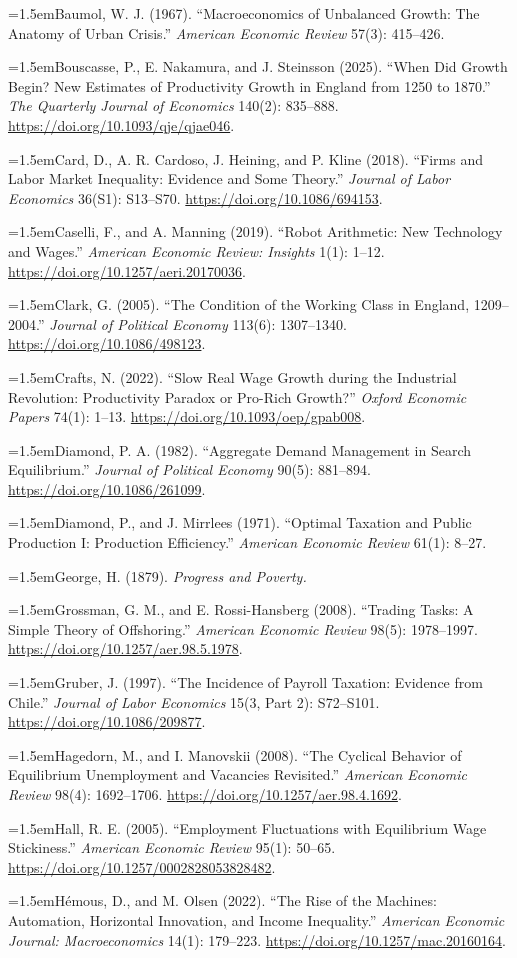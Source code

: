 \documentclass[12pt]{article}
\theoremstyle{plain}
\newcommand{\refentry}[1]{\par\hangindent=1.5em\hangafter=1\noindent #1}
\begin{document}
{\refentry{Baumol, W. J. (1967). ``Macroeconomics of Unbalanced Growth: The Anatomy of Urban Crisis.'' \emph{American Economic Review} 57(3): 415--426.}
\refentry{Bouscasse, P., E. Nakamura, and J. Steinsson (2025). ``When Did Growth Begin? New Estimates of Productivity Growth in England from 1250 to 1870.'' \emph{The Quarterly Journal of Economics} 140(2): 835--888. \url{https://doi.org/10.1093/qje/qjae046}.}
\refentry{Card, D., A. R. Cardoso, J. Heining, and P. Kline (2018). ``Firms and Labor Market Inequality: Evidence and Some Theory.'' \emph{Journal of Labor Economics} 36(S1): S13--S70. \url{https://doi.org/10.1086/694153}.}
\refentry{Caselli, F., and A. Manning (2019). ``Robot Arithmetic: New Technology and Wages.'' \emph{American Economic Review: Insights} 1(1): 1--12. \url{https://doi.org/10.1257/aeri.20170036}.}
\refentry{Clark, G. (2005). ``The Condition of the Working Class in England, 1209--2004.'' \emph{Journal of Political Economy} 113(6): 1307--1340. \url{https://doi.org/10.1086/498123}.}
\refentry{Crafts, N. (2022). ``Slow Real Wage Growth during the Industrial Revolution: Productivity Paradox or Pro-Rich Growth?'' \emph{Oxford Economic Papers} 74(1): 1--13. \url{https://doi.org/10.1093/oep/gpab008}.}
\refentry{Diamond, P. A. (1982). ``Aggregate Demand Management in Search Equilibrium.'' \emph{Journal of Political Economy} 90(5): 881--894. \url{https://doi.org/10.1086/261099}.}
\refentry{Diamond, P., and J. Mirrlees (1971). ``Optimal Taxation and Public Production I: Production Efficiency.'' \emph{American Economic Review} 61(1): 8--27.}
\refentry{George, H. (1879). \emph{Progress and Poverty.}}
\refentry{Grossman, G. M., and E. Rossi-Hansberg (2008). ``Trading Tasks: A Simple Theory of Offshoring.'' \emph{American Economic Review} 98(5): 1978--1997. \url{https://doi.org/10.1257/aer.98.5.1978}.}
\refentry{Gruber, J. (1997). ``The Incidence of Payroll Taxation: Evidence from Chile.'' \emph{Journal of Labor Economics} 15(3, Part 2): S72--S101. \url{https://doi.org/10.1086/209877}.}
\refentry{Hagedorn, M., and I. Manovskii (2008). ``The Cyclical Behavior of Equilibrium Unemployment and Vacancies Revisited.'' \emph{American Economic Review} 98(4): 1692--1706. \url{https://doi.org/10.1257/aer.98.4.1692}.}
\refentry{Hall, R. E. (2005). ``Employment Fluctuations with Equilibrium Wage Stickiness.'' \emph{American Economic Review} 95(1): 50--65. \url{https://doi.org/10.1257/0002828053828482}.}
\refentry{Hémous, D., and M. Olsen (2022). ``The Rise of the Machines: Automation, Horizontal Innovation, and Income Inequality.'' \emph{American Economic Journal: Macroeconomics} 14(1): 179--223. \url{https://doi.org/10.1257/mac.20160164}.}
}
\end{document}
